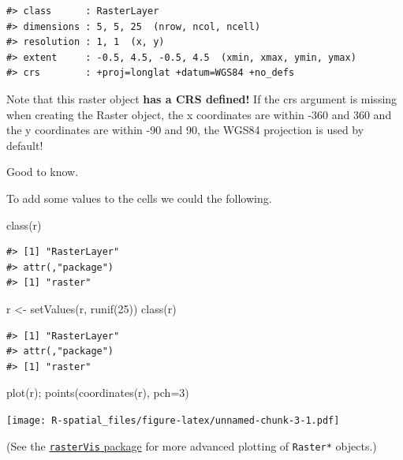 \documentclass[
  11pt,
]{book}
\newenvironment{Shaded}{\begin{snugshade}}{\end{snugshade}}
\newcommand{\AttributeTok}[1]{\textcolor[rgb]{0.77,0.63,0.00}{#1}}
\newcommand{\DecValTok}[1]{\textcolor[rgb]{0.00,0.00,0.81}{#1}}
\newcommand{\FunctionTok}[1]{\textcolor[rgb]{0.00,0.00,0.00}{#1}}
\newcommand{\NormalTok}[1]{#1}
\newcommand{\OtherTok}[1]{\textcolor[rgb]{0.56,0.35,0.01}{#1}}
\begin{document}
\begin{verbatim}
#> class      : RasterLayer 
#> dimensions : 5, 5, 25  (nrow, ncol, ncell)
#> resolution : 1, 1  (x, y)
#> extent     : -0.5, 4.5, -0.5, 4.5  (xmin, xmax, ymin, ymax)
#> crs        : +proj=longlat +datum=WGS84 +no_defs
\end{verbatim}

Note that this raster object \textbf{has a CRS defined!} If the crs argument is missing when creating the Raster object, the x coordinates are within -360 and 360 and the y coordinates are within -90 and 90, the WGS84 projection is used by default!

Good to know.

To add some values to the cells we could the following.

\begin{Shaded}
\begin{Highlighting}[]
\FunctionTok{class}\NormalTok{(r)}
\end{Highlighting}
\end{Shaded}

\begin{verbatim}
#> [1] "RasterLayer"
#> attr(,"package")
#> [1] "raster"
\end{verbatim}

\begin{Shaded}
\begin{Highlighting}[]
\NormalTok{r }\OtherTok{\textless{}{-}} \FunctionTok{setValues}\NormalTok{(r, }\FunctionTok{runif}\NormalTok{(}\DecValTok{25}\NormalTok{))}
\FunctionTok{class}\NormalTok{(r)}
\end{Highlighting}
\end{Shaded}

\begin{verbatim}
#> [1] "RasterLayer"
#> attr(,"package")
#> [1] "raster"
\end{verbatim}

\begin{Shaded}
\begin{Highlighting}[]
\FunctionTok{plot}\NormalTok{(r); }\FunctionTok{points}\NormalTok{(}\FunctionTok{coordinates}\NormalTok{(r), }\AttributeTok{pch=}\DecValTok{3}\NormalTok{)}
\end{Highlighting}
\end{Shaded}

\texttt{[image: R-spatial\_files/figure-latex/unnamed-chunk-3-1.pdf]}

(See the \href{https://cran.r-project.org/web/packages/rasterVis/index.html}{\texttt{rasterVis} package} for more advanced plotting of \texttt{Raster*} objects.)
\end{document}
